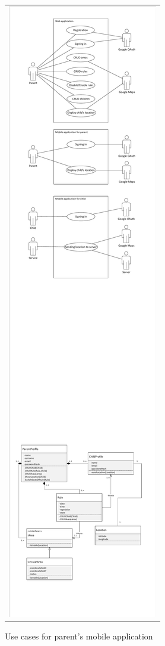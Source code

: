 \documentclass{sprawozdanie-agh}
\begin{document}
    	\begin{figure}[H]
    		\centering
    		\begin{tabular}{c}
    			\includegraphics[width=.80\textwidth]{parentUseCase}
    		\end{tabular}
    		\caption{Use cases for parent's mobile application}
    	\end{figure}
\end{document}

